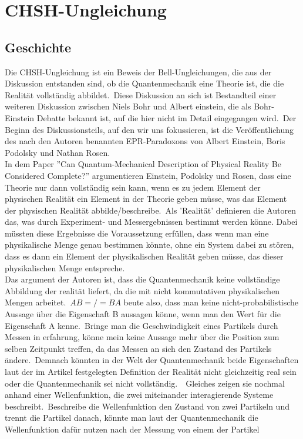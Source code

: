 \section{CHSH-Ungleichung}
\label{sec:chsh}


\subsection{Geschichte}
\label{subsec:chsh_geschichte}
Die CHSH-Ungleichung ist ein Beweis der Bell-Ungleichungen, die aus der Diskussion entstanden sind, ob die Quantenmechanik eine Theorie ist,
die die Realität vollständig abbildet.\ Diese Diskussion an sich ist Bestandteil einer weiteren Diskussion zwischen Niels Bohr und Albert einstein,
die als Bohr-Einstein Debatte bekannt ist, auf die hier nicht im Detail eingegangen wird.\ Der Beginn des Diskussionsteils, auf den wir uns fokussieren,
ist die Veröffentlichung des nach den Autoren benannten EPR-Paradoxons von Albert Einstein, Boris Podolsky und Nathan Rosen.\\
In dem Paper ''Can Quantum-Mechanical Description of Physical Reality Be Considered Complete?'' argumentieren Einstein, Podolsky und Rosen, dass
eine Theorie nur dann vollständig sein kann, wenn es zu jedem Element der physischen Realität ein Element in der Theorie geben müsse, was das Element
der physischen Realität abbilde/beschreibe.\ Als 'Realität' definieren die Autoren das, was durch Experiment- und Messergebnissen bestimmt werden könne.
Dabei müssten diese Ergebnisse die Voraussetzung erfüllen, dass wenn man eine physikalische Menge genau bestimmen könnte, ohne ein System dabei zu stören,
dass es dann ein Element der physikalischen Realität geben müsse, das dieser physikalischen Menge entspreche.\\
Das argument der Autoren ist, dass die Quantenmechanik keine vollständige Abbildung der realität liefert, da die mit nicht kommutativen physikalischen Mengen arbeitet.\
$AB =/= BA$ beute also, dass man keine nicht-probabilistische Aussage über die Eigenschaft B aussagen könne, wenn man den Wert für die Eigenschaft A kenne.\ Bringe man die Geschwindigkeit eines Partikels durch Messen in erfahrung, könne mein keine Aussage mehr über die Position zum selben Zeitpunkt treffen,
da das Messen an sich den Zustand des Partikels ändere.\ Demnach könnten in der Welt der Quantenmechanik beide Eigenschaften laut der im Artikel festgelegten Definition der Realität nicht gleichzeitig real sein oder die Quantenmechanik sei nicht vollständig.\
\ Gleiches zeigen sie nochmal anhand einer Wellenfunktion, die zwei miteinander interagierende Systeme beschreibt.\ Beschreibe die Wellenfunktion den Zustand von zwei Partikeln und trennt die Partikel danach, könnte man laut der Quantenmechanik die Wellenfunktion dafür nutzen nach der Messung von einem der Partikel
